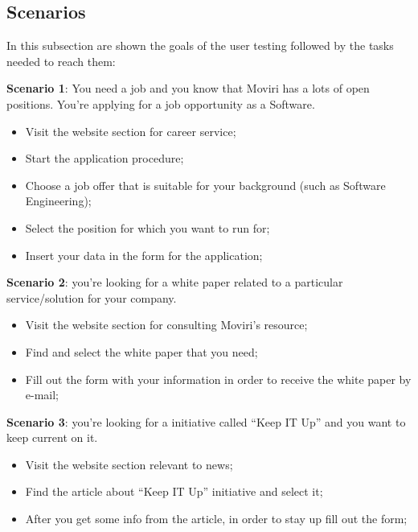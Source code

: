 \subsection{Scenarios}
In this subsection are shown the goals of the user testing followed by the tasks needed to reach them:\par
\textbf{Scenario 1}: You need a job and you know that Moviri has a lots of open positions. You’re applying for a job opportunity as a Software.
\begin{itemize}
\item Visit the website section for career service;
\item Start the application procedure;
\item Choose a job offer that is suitable for your background (such as Software Engineering); 
\item Select the position for which you want to run for;
\item Insert your data in the form for the application;
\end{itemize}\par
\textbf{Scenario 2}: you’re looking for a white paper related to a particular service/solution for your company.
\begin{itemize}
\item Visit the website section for consulting Moviri’s resource;
\item Find and select the white paper that you need;
\item Fill out the form with your information in order to receive the white paper by e-mail;
\end{itemize}\par
\textbf{Scenario 3}: you’re looking for a initiative called “Keep IT Up” and you want to keep current on it.
\begin{itemize}
\item Visit the website section relevant to news;
\item Find the article about “Keep IT Up” initiative and select it;
\item After you get some info from the article, in order to stay up fill out the form;
\end{itemize}\par

